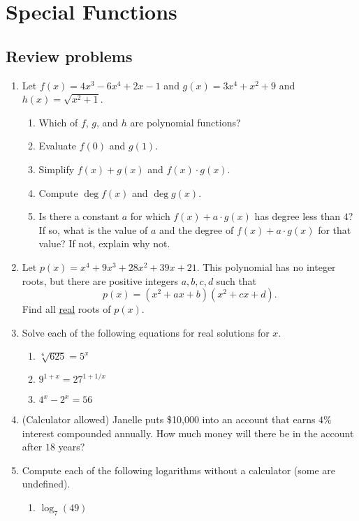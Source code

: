 \section{Special Functions}

\subsection{Review problems}

\begin{enumerate}
\item Let $f(x) = 4x^3 - 6x^4 + 2x - 1$ and $g(x) = 3x^4 + x^2 + 9$ and $h(x) = \sqrt{x^2 + 1}$.
\begin{enumerate}
\item Which of $f$, $g$, and $h$ are polynomial functions?
\item Evaluate $f(0)$ and $g(1)$.
\item Simplify $f(x) + g(x)$ and $f(x)\cdot g(x)$.
\item Compute $\deg f(x)$ and $\deg g(x)$.
\item Is there a constant $a$ for which $f(x) + a\cdot g(x)$ has degree less than $4$? If so, what is the value of $a$ and the degree of $f(x) + a\cdot g(x)$ for that value? If not, explain why not.
\end{enumerate}
\item Let $p(x) = x^4 + 9x^3 + 28x^2 + 39x + 21$. This polynomial has no integer roots, but there are positive integers $a,b,c,d$ such that 
\begin{equation*}
p(x) = (x^2 + ax + b)(x^2 + cx + d).
\end{equation*}
Find all \underline{real} roots of $p(x)$.
\item Solve each of the following equations for real solutions for $x$.
\begin{enumerate}
\item $\sqrt[6]{625} = 5^x$
\item $9^{1 + x} = 27^{1 + 1/x}$
\item $4^x - 2^x = 56$
\end{enumerate}
\item (Calculator allowed) Janelle puts \$10,000 into an account that earns $4\%$ interest compounded annually. How much money will there be in the account after $18$ years?
\item Compute each of the following logarithms without a calculator (some are undefined).
\begin{enumerate}
\item $\log_7(49)$

\end{enumerate}
\end{enumerate}
